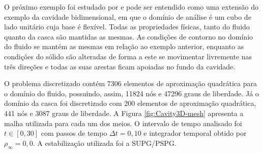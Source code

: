 O próximo exemplo foi estudado por  e pode ser entendido como uma extensão do exemplo da cavidade bidimensional, em que o domínio de análise é um cubo de lado unitário cuja base é flexível. Todas as propriedades físicas, tanto do fluido quanto da casca são mantidas as mesmas. As condições de contorno no domínio do fluido se mantém as mesmas em relação ao exemplo anterior, enquanto as condições do sólido são alteradas de forma a este se movimentar livremente nas três direções e todas as suas arestas ficam apoiadas no fundo da cavidade.

O problema discretizado contém 7306 elementos de aproximação quadrática para o domínio do fluido, possuindo, assim, 11824 nós e 47296 graus de liberdade. Já o domínio da casca foi discretizado com 200 elementos de aproximação quadrática, 441 nós e 3087 graus de liberdade. A Figura \ref{fig:Cavity3D-mesh} apresenta a malha utilizada para cada um dos meios. O intervalo de tempo analisado foi $t\in[0,30]$ com passos de tempo $\Delta t=0,10$ e integrador temporal obtido por $\rho_\infty=0,0$. A estabilização utilizada foi a SUPG/PSPG.

